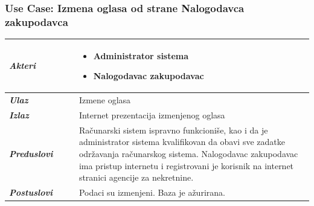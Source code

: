\documentclass[20pt]{article}
\begin{document}
\subsubsection{\bfseries \large Use Case: Izmena oglasa od strane Nalogodavca zakupodavca}
\begin{center}
\begin{longtable}{p{0.23\linewidth} p{0.77\linewidth}}
 \hline
 {\it \bfseries Akteri} & \begin{itemize}
    \item Administrator sistema
    \item Nalogodavac zakupodavac
\end{itemize}\\
\hline

 {\it \bfseries Ulaz} & Izmene oglasa\\
 \hline
 
 {\it \bfseries Izlaz} & Internet prezentacija izmenjenog oglasa\\
 \hline
 
 {\it \bfseries Preduslovi} & Ra\v {c}unarski sistem ispravno funkcioni\v {s}e, kao i da je administrator sistema kvalifikovan da obavi sve zadatke odr\v {z}avanja ra\v {c}unarskog sistema. Nalogodavac zakupodavac ima pristup internetu i registrovani je korisnik na internet stranici agencije za nekretnine.\\
 \hline
 
 {\it \bfseries Postuslovi} & Podaci su izmenjeni. Baza je a\v {z}urirana.\\
 \hline


\end{longtable}
\end{center}
\end{document}

